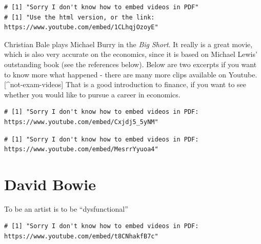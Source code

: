 \documentclass[]{book}
\theoremstyle{definition}
\theoremstyle{definition}
\theoremstyle{definition}
\theoremstyle{remark}
\begin{document}
\begin{verbatim}
# [1] "Sorry I don't know how to embed videos in PDF"
# [1] "Use the html version, or the link: https://www.youtube.com/embed/1CLhqjOzoyE"
\end{verbatim}

Christian Bale plays Michael Burry in the \emph{Big Short}. It really is
a great movie, which is also very accurate on the economics, since it is
based on Michael Lewis' outstanding book (see the references below).
Below are two excerpts if you want to know more what happened - there
are many more clips available on Youtube.{[}\^{}not-exam-videos{]} That
is a good introduction to finance, if you want to see whether you would
like to pursue a career in economics.

\begin{verbatim}
# [1] "Sorry I don't know how to embed videos in PDF: https://www.youtube.com/embed/Cxjdj5_5yNM"
\end{verbatim}

\begin{verbatim}
# [1] "Sorry I don't know how to embed videos in PDF: https://www.youtube.com/embed/MesrrYyuoa4"
\end{verbatim}

\section{David Bowie}\label{david-bowie}

To be an artist is to be ``dysfunctional''

\begin{verbatim}
# [1] "Sorry I don't know how to embed videos in PDF: https://www.youtube.com/embed/t8CNhakfB7c"
\end{verbatim}


\end{document}
